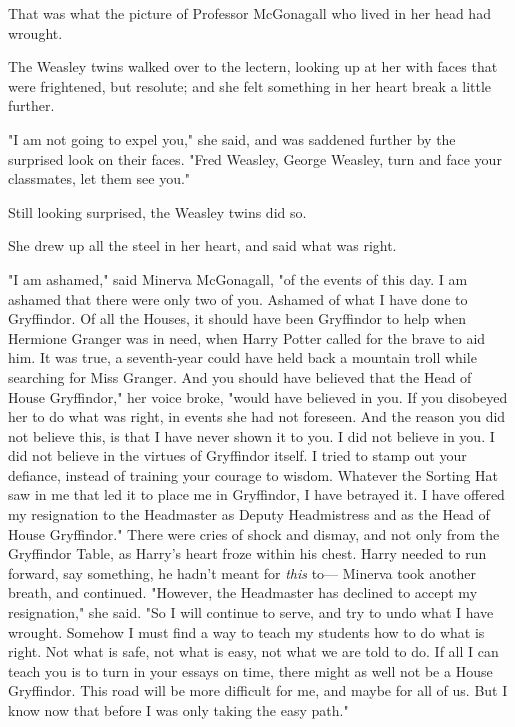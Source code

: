 That was what the picture of Professor McGonagall who lived in her head had 
wrought.

The Weasley twins walked over to the lectern, looking up at her with faces that 
were frightened, but resolute; and she felt something in her heart break a 
little further.

"I am not going to expel you," she said, and was saddened further by the 
surprised look on their faces. "Fred Weasley, George Weasley, turn and face 
your classmates, let them see you."

Still looking surprised, the Weasley twins did so.

She drew up all the steel in her heart, and said what was right.

"I am ashamed," said Minerva McGonagall, "of the events of this day. I am 
ashamed that there were only two of you. Ashamed of what I have done to 
Gryffindor. Of all the Houses, it should have been Gryffindor to help when 
Hermione Granger was in need, when Harry Potter called for the brave to aid 
him. It was true, a seventh-year could have held back a mountain troll while 
searching for Miss Granger. And you should have believed that the Head of House 
Gryffindor," her voice broke, "would have believed in you. If you disobeyed her 
to do what was right, in events she had not foreseen. And the reason you did 
not believe this, is that I have never shown it to you. I did not believe in 
you. I did not believe in the virtues of Gryffindor itself. I tried to stamp 
out your defiance, instead of training your courage to wisdom. Whatever the 
Sorting Hat saw in me that led it to place me in Gryffindor, I have betrayed 
it. I have offered my resignation to the Headmaster as Deputy Headmistress and 
as the Head of House Gryffindor."
\sbreak
There were cries of shock and dismay, and not only from the Gryffindor Table, 
as Harry's heart froze within his chest. Harry needed to run forward, say 
something, he hadn't meant for \emph{this} to---
\sbreak
Minerva took another breath, and continued. "However, the Headmaster has 
declined to accept my resignation," she said. "So I will continue to serve, and 
try to undo what I have wrought. Somehow I must find a way to teach my students 
how to do what is right. Not what is safe, not what is easy, not what we are 
told to do. If all I can teach you is to turn in your essays on time, there 
might as well not be a House Gryffindor. This road will be more difficult for 
me, and maybe for all of us. But I know now that before I was only taking the 
easy path."

